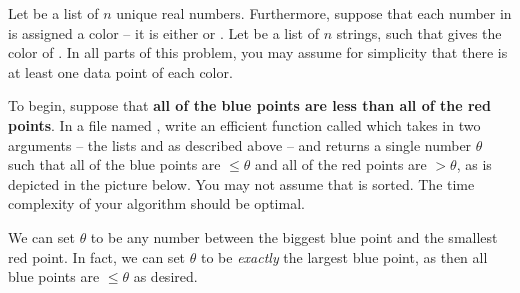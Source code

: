 \begin{progprob}

    Let  be a list of $n$ unique real numbers. Furthermore,
    suppose that each number in  is assigned a color -- it is
    either  or . Let  be a list
    of $n$ strings, such that  gives the color of
    . In all parts of this problem, you may assume for simplicity
    that there is at least one data point of each color.
    
    \begin{subprobset}

        \begin{subprob}
            To begin, suppose that \textbf{all of the blue points are less than all of the red points}.
            In a file named , write an efficient function called
             which takes in two arguments -- the lists 
            and  as described above -- and returns a single number $\theta$
            such that all of the blue points are $\leq
            \theta$ and all of the red points are $> \theta$, as is depicted in
            the picture below. You may not assume that  is
            sorted. The time complexity of your algorithm should be optimal.

            \begin{center}
            \end{center}        

            
            \begin{soln}
                We can set $\theta$ to be any number between the biggest blue
                point and the smallest red point. In fact, we can set $\theta$
                to be \emph{exactly} the largest blue point, as then all blue
                points are $\leq \theta$ as desired.


\end{soln}
\end{subprob}
\end{subprobset}
\end{progprob}
